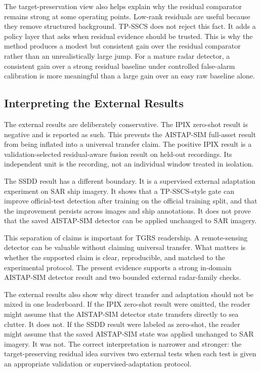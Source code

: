 \documentclass[journal]{IEEEtran}
\begin{document}
The target-preservation view also helps explain why the residual comparator remains strong at some operating points. Low-rank residuals are useful because they remove structured background. TP-SSCS does not reject this fact. It adds a policy layer that asks when residual evidence should be trusted. This is why the method produces a modest but consistent gain over the residual comparator rather than an unrealistically large jump. For a mature radar detector, a consistent gain over a strong residual baseline under controlled false-alarm calibration is more meaningful than a large gain over an easy raw baseline alone.

\subsection{Interpreting the External Results}

The external results are deliberately conservative. The IPIX zero-shot result is negative and is reported as such. This prevents the AISTAP-SIM full-asset result from being inflated into a universal transfer claim. The positive IPIX result is a validation-selected residual-aware fusion result on held-out recordings. Its independent unit is the recording, not an individual window treated in isolation.

The SSDD result has a different boundary. It is a supervised external adaptation experiment on SAR ship imagery. It shows that a TP-SSCS-style gate can improve official-test detection after training on the official training split, and that the improvement persists across images and ship annotations. It does not prove that the saved AISTAP-SIM detector can be applied unchanged to SAR imagery.

This separation of claims is important for TGRS readership. A remote-sensing detector can be valuable without claiming universal transfer. What matters is whether the supported claim is clear, reproducible, and matched to the experimental protocol. The present evidence supports a strong in-domain AISTAP-SIM detector result and two bounded external radar-family checks.

The external results also show why direct transfer and adaptation should not be mixed in one leaderboard. If the IPIX zero-shot result were omitted, the reader might assume that the AISTAP-SIM detector state transfers directly to sea clutter. It does not. If the SSDD result were labeled as zero-shot, the reader might assume that the saved AISTAP-SIM state was applied unchanged to SAR imagery. It was not. The correct interpretation is narrower and stronger: the target-preserving residual idea survives two external tests when each test is given an appropriate validation or supervised-adaptation protocol.
\end{document}
